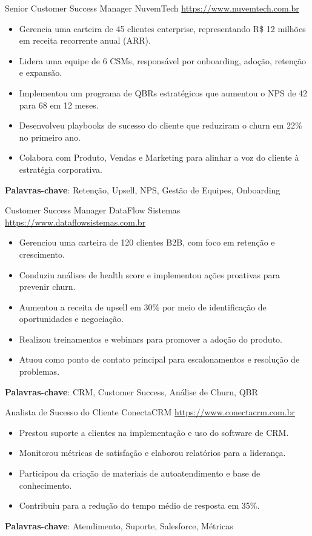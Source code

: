 \documentclass[a4paper, serif, 10pt]{moderncv}
\begin{document}
        {Senior Customer Success Manager}
        {NuvemTech}
        {\url{https://www.nuvemtech.com.br}}
        {}
        {\begin{itemize}
\item Gerencia uma carteira de 45 clientes enterprise, representando R\$ 12 milhões em receita recorrente anual (ARR).
\item Lidera uma equipe de 6 CSMs, responsável por onboarding, adoção, retenção e expansão.
\item Implementou um programa de QBRs estratégicos que aumentou o NPS de 42 para 68 em 12 meses.
\item Desenvolveu playbooks de sucesso do cliente que reduziram o churn em 22\% no primeiro ano.
\item Colabora com Produto, Vendas e Marketing para alinhar a voz do cliente à estratégia corporativa.
\end{itemize}
\textbf{Palavras-chave}: Retenção, Upsell, NPS, Gestão de Equipes, Onboarding}

        {Customer Success Manager}
        {DataFlow Sistemas}
        {\url{https://www.dataflowsistemas.com.br}}
        {}
        {\begin{itemize}
\item Gerenciou uma carteira de 120 clientes B2B, com foco em retenção e crescimento.
\item Conduziu análises de health score e implementou ações proativas para prevenir churn.
\item Aumentou a receita de upsell em 30\% por meio de identificação de oportunidades e negociação.
\item Realizou treinamentos e webinars para promover a adoção do produto.
\item Atuou como ponto de contato principal para escalonamentos e resolução de problemas.
\end{itemize}
\textbf{Palavras-chave}: CRM, Customer Success, Análise de Churn, QBR}

        {Analista de Sucesso do Cliente}
        {ConectaCRM}
        {\url{https://www.conectacrm.com.br}}
        {}
        {\begin{itemize}
\item Prestou suporte a clientes na implementação e uso do software de CRM.
\item Monitorou métricas de satisfação e elaborou relatórios para a liderança.
\item Participou da criação de materiais de autoatendimento e base de conhecimento.
\item Contribuiu para a redução do tempo médio de resposta em 35\%.
\end{itemize}
\textbf{Palavras-chave}: Atendimento, Suporte, Salesforce, Métricas}
\end{document}

